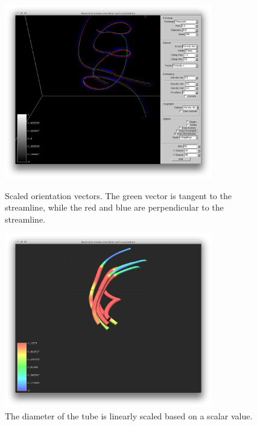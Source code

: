 \begin{figure}[htbp]
\centering
\begin{minipage}[t]{0.48\textwidth}
        \includegraphics[height=3in]{figures/streamtubes/uvp.png}
\caption{Scaled orientation vectors. The green vector is tangent to the streamline, while the red and blue are perpendicular to the streamline.}
\label{fig:orientationVec}
\end{minipage}\hspace{.04\textwidth}%
\begin{minipage}[t]{0.48\textwidth}
               \includegraphics[height=3in]{figures/streamtubes/11thickTubes.png} 
    \caption{The diameter of the tube is linearly scaled based on a scalar value.}
    \label{fig:thicktubes}
\end{minipage}
\end{figure}



